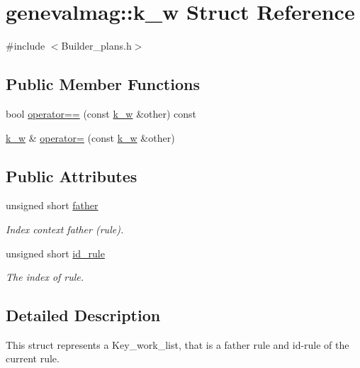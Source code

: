 \hypertarget{structgenevalmag_1_1k__w}{
\section{genevalmag::k\_\-w Struct Reference}
\label{structgenevalmag_1_1k__w}
}


{\ttfamily \#include $<$Builder\_\-plans.h$>$}

\subsection*{Public Member Functions}
\begin{DoxyCompactItemize}
\item 
bool \hyperlink{structgenevalmag_1_1k__w_abfdaef873a635401975794595679a251}{operator==} (const \hyperlink{structgenevalmag_1_1k__w}{k\_\-w} \&other) const 
\item 
\hyperlink{structgenevalmag_1_1k__w}{k\_\-w} \& \hyperlink{structgenevalmag_1_1k__w_a60b600d54504f37f1abb332481ae3886}{operator=} (const \hyperlink{structgenevalmag_1_1k__w}{k\_\-w} \&other)
\end{DoxyCompactItemize}
\subsection*{Public Attributes}
\begin{DoxyCompactItemize}
\item 
unsigned short \hyperlink{structgenevalmag_1_1k__w_aef2a6d852e6beedc2247a9fc62033313}{father}
\begin{DoxyCompactList}\small\item\em Index context father (rule). \item\end{DoxyCompactList}\item 
unsigned short \hyperlink{structgenevalmag_1_1k__w_ab31e8aba428c97c3717c5860509eb3cc}{id\_\-rule}
\begin{DoxyCompactList}\small\item\em The index of rule. \item\end{DoxyCompactList}\end{DoxyCompactItemize}


\subsection{Detailed Description}
This struct represents a Key\_\-work\_\-list, that is a father rule and id-\/rule of the current rule. 

